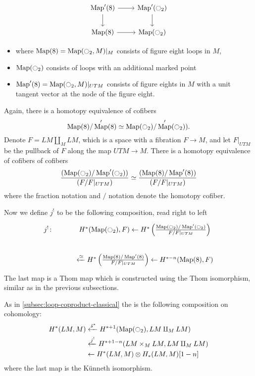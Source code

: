 \documentclass{scrartcl}
\let\emph\relax
\theoremstyle{plain}
\theoremstyle{definition}
\newcommand{\quiso}{\simeq}
\newcommand{\from}{\leftarrow}
\let\xfrom\xleftarrow
\DeclareMathOperator{\Map}{Map}
\renewcommand{\coprod}{\mathbin{\amalg}}
\begin{document}
\begin{equation}
    \begin{tikzcd}
        \Map'(8) \rar\dar &\Map'(\ocircle_2)\dar \\
        \Map(8) \rar & \Map(\ocircle_2)
    \end{tikzcd}
\end{equation}

\begin{itemize}
\item where $\Map(8) = \Map(\ocircle_2, M)|_M$ consists of figure eight loops in $M$,
\item $\Map(\ocircle_2)$ consists of loops with an additional marked point
\item $\Map'(8) = \Map(\ocircle_2, M)|_{UTM}$ consists of figure eights in $M$ with a unit tangent vector at the node of the figure eight.
\end{itemize}
Again, there is a homotopy equivalence of cofibers $$\Map(8) / \Map'(8) \quiso \Map(\ocircle_2)/\Map'(\ocircle_2)).$$ Denote $F = LM\coprod_M LM$, which is a space with a fibration $F\to M$, and let $F|_{UTM}$ be the pullback of $F$ along the map $UTM\to M$. There is a homotopy equivalence of cofibers of cofibers
\begin{align*}
    \frac{(\Map(\ocircle_2) / \Map'(\ocircle_2))} {(F / F|_{UTM}) } \quiso \frac{(\Map(8) / \Map'(8)) }{(F / F|_{UTM})}
\end{align*}
where the fraction notation and $/$ notation denote the homotopy cofiber. 

Now we define $j^!$ to be the following composition, read right to left
\[
\begin{tikzcd}
    j^!\colon &H^*(\Map(\ocircle_2), F) \from H^*\left(\frac{\Map(\ocircle_2) / \Map'(\ocircle_2)} {F / F|_{UTM}}\right) \\ &\xfrom{\quiso} H^*\left(\frac{\Map(8) / \Map'(8)} {F/ F|_{UTM}}\right) \from H^{*-n}(\Map(8), F)
\end{tikzcd}
\]
The last map is a Thom map which is constructed using the Thom isomorphism, similar as in the previous subsections. 

As in \cref{subsec:loop-coproduct-classical} the \emph{Loop Coproduct} is the following composition on cohomology:
\begin{align*}
    H^*(LM, M) &\xfrom{\tilde s^*} H^{*+1}(\Map(\ocircle_2), LM\coprod_M LM) \\ &\xfrom{j^!} H^{*+1-n}(LM\times_M LM, LM\coprod_M LM) \\ &\from H^{*}(LM, M)\otimes H_*(LM, M)[1-n]
\end{align*}
where the last map is the Künneth isomorphism.
\end{document}
